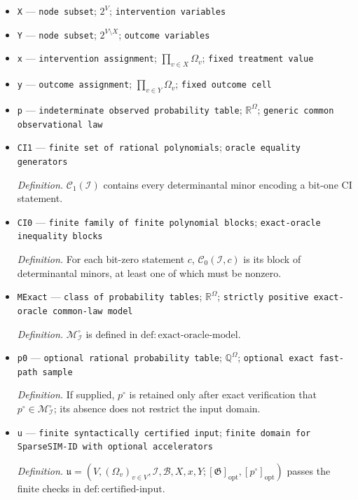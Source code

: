 \documentclass{article}
\begin{document}
\begin{itemize}
  \item \texttt{X} --- \texttt{node subset}; \(2^V\); \texttt{intervention variables}
  \item \texttt{Y} --- \texttt{node subset}; \(2^{V\setminus X}\); \texttt{outcome variables}
  \item \texttt{x} --- \texttt{intervention assignment}; \(\prod_{v\in X}\Omega_v\); \texttt{fixed treatment value}
  \item \texttt{y} --- \texttt{outcome assignment}; \(\prod_{v\in Y}\Omega_v\); \texttt{fixed outcome cell}
  \item \texttt{p} --- \texttt{indeterminate observed probability table}; \(\mathbb R^{\Omega}\); \texttt{generic common observational law}
  \item \texttt{CI1} --- \texttt{finite set of rational polynomials}; \texttt{oracle equality generators}
  \par\smallskip\noindent\emph{Definition.} \(\mathcal C_1(\mathcal I)\) contains every determinantal minor encoding a bit-one CI statement.
  \item \texttt{CI0} --- \texttt{finite family of finite polynomial blocks}; \texttt{exact-\allowbreak{}oracle inequality blocks}
  \par\smallskip\noindent\emph{Definition.} For each bit-zero statement \(c\), \(\mathcal C_0(\mathcal I,c)\) is its block of determinantal minors, at least one of which must be nonzero.
  \item \texttt{MExact} --- \texttt{class of probability tables}; \(\mathbb R^{\Omega}\); \texttt{strictly positive exact-\allowbreak{}oracle common-\allowbreak{}law model}
  \par\smallskip\noindent\emph{Definition.} \(\mathcal M_{\mathcal I}^{\circ}\) is defined in \(\mathrm{def{:}exact\text{-}oracle\text{-}model}\).
  \item \texttt{p0} --- \texttt{optional rational probability table}; \(\mathbb Q^{\Omega}\); \texttt{optional exact fast-\allowbreak{}path sample}
  \par\smallskip\noindent\emph{Definition.} If supplied, \(p^{\circ}\) is retained only after exact verification that \(p^{\circ}\in\mathcal M_{\mathcal I}^{\circ}\); its absence does not restrict the input domain.
  \item \texttt{u} --- \texttt{finite syntactically certified input}; \texttt{finite domain for SparseSIM-\allowbreak{}ID with optional accelerators}
  \par\smallskip\noindent\emph{Definition.} \(\mathfrak u=(V,(\Omega_v)_{v\in V},\mathcal I,\mathcal B,X,x,Y;[\mathfrak G]_{\mathrm{opt}},[p^{\circ}]_{\mathrm{opt}})\) passes the finite checks in \(\mathrm{def{:}certified\text{-}input}\).

\end{itemize}
\end{document}
